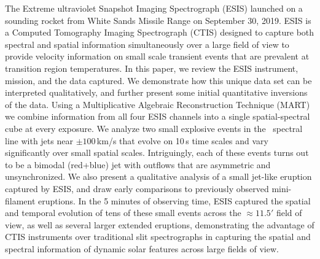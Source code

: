 The Extreme ultraviolet Snapshot Imaging Spectrograph (ESIS) launched on a sounding rocket from White Sands Missile Range on September 30, 2019.
ESIS is a Computed Tomography Imaging Spectrograph (CTIS) designed to capture both spectral and spatial information simultaneously over a large field of view to provide velocity information on small scale transient events that are prevalent at transition region temperatures.
In this paper, we review the ESIS instrument, mission, and the data captured.
We demonstrate how this unique data set can be interpreted qualitatively, and further present some initial quantitative inversions of the data.
Using a Multiplicative Algebraic Reconstruction Technique (MART) we combine information from all four ESIS channels into a single spatial-spectral cube at every exposure.
We analyze two small explosive events in the \ov \ spectral line with jets near $\pm 100$\,km/s that evolve on 10\,s time scales and vary significantly over small spatial scales. Intriguingly, each of these events turns out to be a bimodal (red+blue) jet with outflows that are asymmetric and unsynchronized.
We also present a qualitative analysis of a small jet-like eruption captured by ESIS, and draw early comparisons to previously observed mini-filament eruptions.
In the 5 minutes of observing time, ESIS captured the spatial and temporal evolution of tens of these small events across the $\approx 11.5'$ field of view, as well as several larger extended eruptions, demonstrating the advantage of CTIS instruments over traditional slit spectrographs in capturing the spatial and spectral information of dynamic solar features across large fields of view.